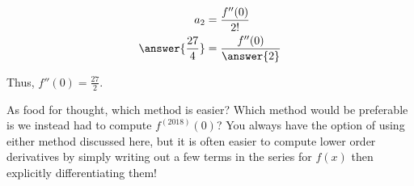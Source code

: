 \documentclass{ximera}
\begin{document}
\begin{exercise}
\begin{exercise}
\begin{exercise}
\begin{align*}
a_2 &= \frac{f''(0)}{2!} \\
\answer{\frac{27}{4}} &= \frac{f''(0)}{\answer{2}}
\end{align*}


Thus, $f''(0) = \frac{27}{2}$.
\end{exercise}
\end{exercise}

As food for thought, which method is easier?  Which method would be preferable is we instead had to compute $f^{(2018)}(0)$?
You always have the option of using either method discussed here, but it is often easier to compute lower order derivatives by simply writing out a few terms in the series for $f(x)$ then explicitly differentiating them!

\end{exercise}
\end{document}
